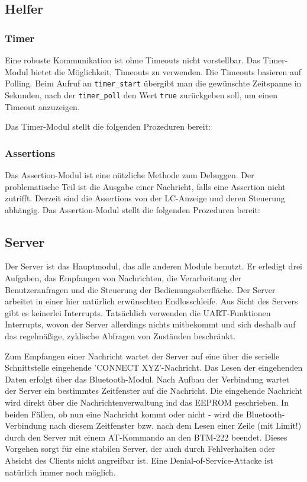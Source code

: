 \documentclass[ngerman]{article}
\begin{document}
\subsection{Helfer}


\subsubsection{Timer}

Eine robuste Kommunikation ist ohne Timeouts nicht vorstellbar.
Das Timer-Modul bietet die Möglichkeit, Timeouts zu verwenden.
Die Timeouts basieren auf Polling. Beim Aufruf
an {\tt timer\_start} übergibt man die gewünschte Zeitspanne in
Sekunden, nach der {\tt timer\_poll} den Wert {\tt true}
zurückgeben soll, um einen Timeout anzuzeigen. 

Das Timer-Modul stellt die folgenden Prozeduren bereit:



\subsubsection{Assertions}

Das Assertion-Modul ist eine nützliche Methode zum Debuggen.
Der problematische Teil ist die Ausgabe einer Nachricht, falls
eine Assertion nicht zutrifft. Derzeit sind die Assertions
von der LC-Anzeige und deren Steuerung abhängig. Das Assertion-Modul
stellt die folgenden Prozeduren bereit:




\subsection{Server}

Der Server ist das Hauptmodul, das alle anderen Module benutzt. Er
erledigt drei Aufgaben, das Empfangen von Nachrichten, die Verarbeitung
der Benutzeranfragen und die Steuerung der Bedienungsoberfläche. Der Server arbeitet in einer
hier natürlich erwünschten Endlosschleife. Aus Sicht des Servers gibt es
keinerlei Interrupts. Tatsächlich verwenden die UART-Funktionen Interrupts, 
wovon der Server allerdings nichts mitbekommt und sich deshalb auf das
re\-gel\-mä\-ßige, zyklische Abfragen von Zuständen beschränkt.

Zum Empfangen einer Nachricht wartet der Server auf eine über die
serielle Schnittstelle eingehende 'CONNECT XYZ'-Nachricht. Das Lesen
der eingehenden Daten erfolgt über das Bluetooth-Modul. Nach Aufbau
der Verbindung wartet der Server ein bestimmtes Zeitfenster auf die 
Nachricht. Die eingehende Nachricht wird direkt über die Nachrichtenverwaltung
ind das EEPROM ge\-schrie\-ben. In beiden Fällen, ob nun eine Nachricht kommt
oder nicht - wird die Bluetooth-Verbindung nach diesem Zeitfenster bzw. nach
dem Lesen einer Zeile (mit Limit!) durch den Server mit einem AT-Kommando
an den BTM-222 beendet. Dieses Vorgehen sorgt für eine stabilen Server, der auch
durch Fehlverhalten oder Absicht des Clients nicht angreifbar ist. Eine
Denial-of-Service-Attacke ist natürlich immer noch möglich.
\end{document}
